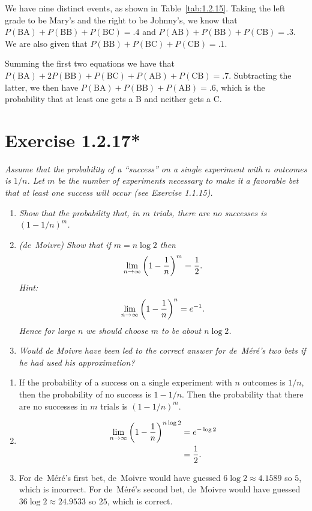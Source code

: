 \documentclass{tufte-handout}
\begin{document}
We have nine distinct events, as shown in
Table~\ref{tab:1.2.15}. Taking the left grade to be Mary's and the
right to be Johnny's, we know that $P(\textrm{BA}) + P(\textrm{BB}) +
P(\textrm{BC}) = .4$ and $P(\textrm{AB}) + P(\textrm{BB}) +
P(\textrm{CB}) = .3$. We are also given that $P(\textrm{BB}) +
P(\textrm{BC}) + P(\textrm{CB}) = .1$.

Summing the first two equations we have that
$P(\textrm{BA}) + 2P(\textrm{BB}) + P(\textrm{BC}) + P(\textrm{AB}) +
P(\textrm{CB}) = .7$.
Subtracting the latter, we then have
$P(\textrm{BA}) + P(\textrm{BB}) + P(\textrm{AB}) = .6$, which is the
probability that at least one gets a B and neither gets a C.

\section{Exercise 1.2.17*}

\emph{Assume that the probability of a ``success'' on a single
  experiment with $n$ outcomes is $1/n$. Let $m$ be the number of
  experiments necessary to make it a favorable bet that at least one
  success will occur (see Exercise 1.1.15).}
\begin{enumerate}[label=(\emph{\alph*})]
  \item \emph{Show that the probability that, in $m$ trials, there are
    no successes is $(1 - 1/n)^m$.}
  \item \emph{(de~Moivre) Show that if $m = n \log 2$ then
    \[
    \lim_{n \rightarrow \infty} {\left( 1 - {1 \over n} \right)}^m = {1
    \over 2}.
    \]
    Hint:
    \[
    \lim_{n \rightarrow \infty} {\left( 1 - {1 \over n} \right)}^n = e^{-1}.
    \]
    Hence for large $n$ we should choose $m$ to be about $n \log 2$.}
  \item \emph{Would de Moivre have been led to the correct answer for
    de~M\'er\'e's two bets if he had used his approximation?}
\end{enumerate}

\bigskip

\begin{enumerate}[label=(\alph*)]
\item If the probability of a success on a single experiment with $n$
  outcomes is $1/n$, then the probability of no success is $1 -
  1/n$. Then the probability that there are no successes in $m$ trials
  is ${(1 - 1/n)}^m$.
\item
  \begin{align*}
    \lim_{n \rightarrow \infty} {\left( 1 - {1 \over n}\right)}^{n
    \log 2} &= e^{ -\log 2} \\
            &= {1 \over 2}.
  \end{align*}
\item For de~M\'er\'e's first bet, de~Moivre would have guessed $6
  \log 2 \approx 4.1589$ so $5$, which is incorrect. For de~M\'er\'e's
  second bet, de~Moivre would have guessed $36 \log 2 \approx 24.9533$
  so $25$, which is correct.
\end{enumerate}
\end{document}
